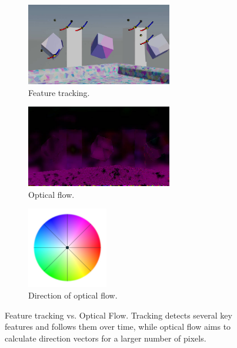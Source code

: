 \documentclass[11pt,english]{report}
\begin{document}
\begin{figure}[!ht]
	\centering
	\begin{subfigure}{180pt}
		\includegraphics[width=180pt]{docs/report/feature-tracking.jpg}
		\caption{\centering Feature tracking.}
	\end{subfigure}
	\begin{subfigure}{180pt}
		\includegraphics[width=180pt]{docs/report/optical-flow.jpg}
		\caption{\centering Optical flow.}
	\end{subfigure}
	\begin{subfigure}{100pt}
		\includegraphics[width=100pt]{docs/report/colour-coding.jpg}
		\caption{\centering Direction of optical flow.}
	\end{subfigure}
	\caption{\centering Feature tracking vs. Optical Flow. Tracking detects several key features and follows them over time, while optical flow aims to calculate direction vectors for a larger number of pixels.}
\end{figure}
\end{document}
